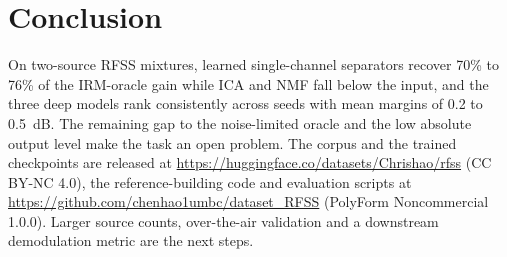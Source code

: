 \documentclass[conference]{IEEEtran}
\begin{document}
\section{Conclusion}

On two-source RFSS mixtures, learned single-channel separators recover 70\% to 76\% of the IRM-oracle gain while ICA and NMF fall below the input, and the three deep models rank
consistently across seeds with mean margins of 0.2 to 0.5~dB. The remaining gap to the noise-limited oracle and the low absolute output level make the task an open problem.
The corpus and the trained checkpoints are released at \url{https://huggingface.co/datasets/Chrishao/rfss} (CC BY-NC 4.0), the reference-building code and evaluation scripts at \url{https://github.com/chenhao1umbc/dataset_RFSS} (PolyForm Noncommercial 1.0.0). Larger source counts, over-the-air validation and a downstream demodulation metric are the next steps.



\end{document}
